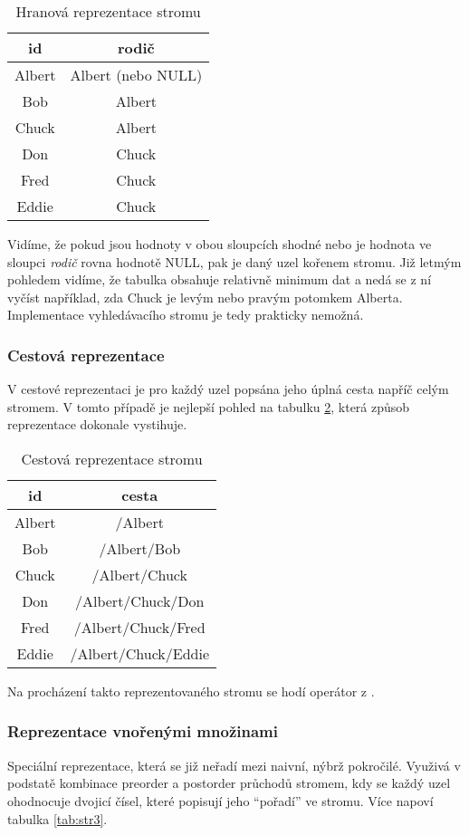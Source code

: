 \begin{table}
\centering
\caption{Hranová reprezentace stromu}\label{tab:str1}
\begin{tabular}{c | c}
id & rodič \\
\hline
Albert & Albert (nebo NULL) \\
Bob & Albert \\
Chuck & Albert \\
Don & Chuck \\
Fred & Chuck \\
Eddie & Chuck
\end{tabular}
\end{table}

Vidíme, že pokud jsou hodnoty v obou sloupcích shodné nebo je hodnota ve sloupci \textit{rodič} rovna hodnotě NULL, pak je daný uzel kořenem stromu. Již letmým pohledem vidíme, že tabulka obsahuje relativně minimum dat a nedá se z ní vyčíst například, zda Chuck je levým nebo pravým potomkem Alberta. Implementace vyhledávacího stromu je tedy prakticky nemožná.


\subsubsection{Cestová reprezentace}
V cestové reprezentaci je pro každý uzel popsána jeho úplná cesta napříč celým stromem. V tomto případě je nejlepší pohled na tabulku \ref{tab:str2}, která způsob reprezentace dokonale vystihuje.

\begin{table}
\centering
\caption{Cestová reprezentace stromu}\label{tab:str2}
\begin{tabular}{c | c}
id & cesta \\
\hline
Albert & /Albert \\
Bob & /Albert/Bob \\
Chuck & /Albert/Chuck \\
Don & /Albert/Chuck/Don \\
Fred & /Albert/Chuck/Fred \\
Eddie & /Albert/Chuck/Eddie
\end{tabular}
\end{table}

Na procházení takto reprezentovaného stromu se hodí operátor z .

\subsubsection{Reprezentace vnořenými množinami}
Speciální reprezentace, která se již neřadí mezi naivní, nýbrž pokročilé. Využivá v podstatě kombinace preorder a postorder průchodů stromem, kdy se každý uzel ohodnocuje dvojicí čísel, které popisují jeho \enquote{pořadí} ve stromu. Více napoví tabulka \ref{tab:str3}.

